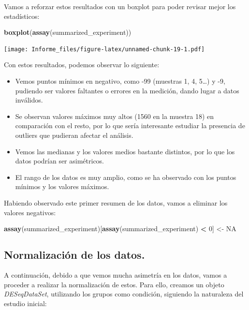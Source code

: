 \documentclass[
]{article}
\newenvironment{Shaded}{\begin{snugshade}}{\end{snugshade}}
\newcommand{\ConstantTok}[1]{\textcolor[rgb]{0.56,0.35,0.01}{#1}}
\newcommand{\DecValTok}[1]{\textcolor[rgb]{0.00,0.00,0.81}{#1}}
\newcommand{\FunctionTok}[1]{\textcolor[rgb]{0.13,0.29,0.53}{\textbf{#1}}}
\newcommand{\NormalTok}[1]{#1}
\newcommand{\OtherTok}[1]{\textcolor[rgb]{0.56,0.35,0.01}{#1}}
\newcommand{\SpecialCharTok}[1]{\textcolor[rgb]{0.81,0.36,0.00}{\textbf{#1}}}
\begin{document}
Vamos a reforzar estos resultados con un boxplot para poder revisar
mejor los estadísticos:

\begin{Shaded}
\begin{Highlighting}[]
\FunctionTok{boxplot}\NormalTok{(}\FunctionTok{assay}\NormalTok{(summarized\_experiment))}
\end{Highlighting}
\end{Shaded}

\texttt{[image: Informe\_files/figure-latex/unnamed-chunk-19-1.pdf]}

Con estos resultados, podemos observar lo siguiente:

\begin{itemize}
\item
  Vemos puntos mínimos en negativo, como -99 (muestras 1, 4, 5\ldots) y
  -9, pudiendo ser valores faltantes o errores en la medición, dando
  lugar a datos inválidos.
\item
  Se observan valores máximos muy altos (1560 en la muestra 18) en
  comparación con el resto, por lo que sería interesante estudiar la
  presencia de outliers que pudieran afectar el análisis.
\item
  Vemos las medianas y los valores medios bastante distintos, por lo que
  los datos podrían ser asimétricos.
\item
  El rango de los datos es muy amplio, como se ha observado con los
  puntos mínimos y los valores máximos.
\end{itemize}

Habiendo observado este primer resumen de los datos, vamos a eliminar
los valores negativos:

\begin{Shaded}
\begin{Highlighting}[]
\FunctionTok{assay}\NormalTok{(summarized\_experiment)[}\FunctionTok{assay}\NormalTok{(summarized\_experiment) }\SpecialCharTok{\textless{}} \DecValTok{0}\NormalTok{] }\OtherTok{\textless{}{-}} \ConstantTok{NA}
\end{Highlighting}
\end{Shaded}

\subsection{Normalización de los
datos.}\label{normalizaciuxf3n-de-los-datos.}

A continuación, debido a que vemos mucha asimetría en los datos, vamos a
proceder a realizar la normalización de estos. Para ello, creamos un
objeto \emph{DESeqDataSet}, utilizando los grupos como condición,
siguiendo la naturaleza del estudio inicial:
\end{document}
